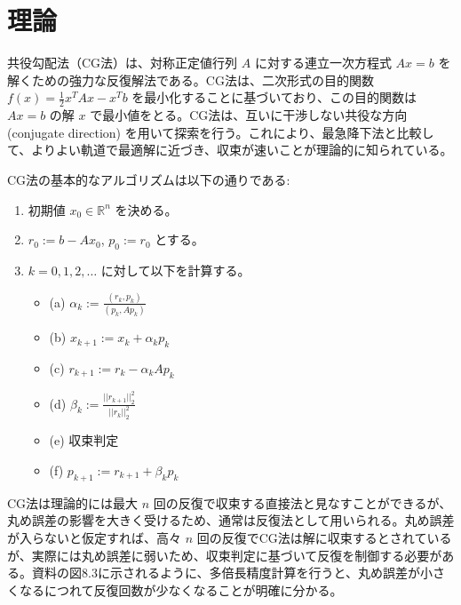 \documentclass{article}
\begin{document}
\section{理論}
共役勾配法（CG法）は、対称正定値行列 $A$ に対する連立一次方程式 $Ax=b$ を解くための強力な反復解法である。CG法は、二次形式の目的関数 $f(x) = \frac{1}{2}x^T Ax - x^T b$ を最小化することに基づいており、この目的関数は $Ax=b$ の解 $x$ で最小値をとる。CG法は、互いに干渉しない共役な方向 (conjugate direction) を用いて探索を行う。これにより、最急降下法と比較して、よりよい軌道で最適解に近づき、収束が速いことが理論的に知られている。

CG法の基本的なアルゴリズムは以下の通りである:
\begin{enumerate}
    \item 初期値 $x_0 \in \mathbb{R}^n$ を決める。
    \item $r_0 := b - Ax_0$, $p_0 := r_0$ とする。
    \item $k = 0, 1, 2, \dots$ に対して以下を計算する。
    \begin{itemize}
        \item (a) $\alpha_k := \frac{(r_k, p_k)}{(p_k, Ap_k)}$
        \item (b) $x_{k+1} := x_k + \alpha_k p_k$
        \item (c) $r_{k+1} := r_k - \alpha_k Ap_k$
        \item (d) $\beta_k := \frac{||r_{k+1}||_2^2}{||r_k||_2^2}$
        \item (e) 収束判定
        \item (f) $p_{k+1} := r_{k+1} + \beta_k p_k$
    \end{itemize}
\end{enumerate}

CG法は理論的には最大 $n$ 回の反復で収束する直接法と見なすことができるが、丸め誤差の影響を大きく受けるため、通常は反復法として用いられる。丸め誤差が入らないと仮定すれば、高々 $n$ 回の反復でCG法は解に収束するとされているが、実際には丸め誤差に弱いため、収束判定に基づいて反復を制御する必要がある。資料の図8.3に示されるように、多倍長精度計算を行うと、丸め誤差が小さくなるにつれて反復回数が少なくなることが明確に分かる\cite{lecture_notes}。
\end{document}
